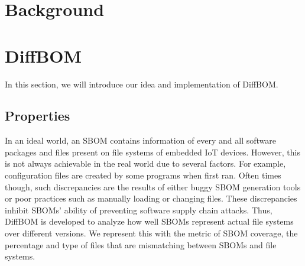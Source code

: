 \section{Background}


\section{DiffBOM}
In this section, we will introduce our idea and implementation of DiffBOM.
\subsection{Properties}
In an ideal world, an SBOM contains information of every and all software packages and files present on file systems of embedded IoT devices. However, this is not always achievable in the real world due to several factors. For example, configuration files are created by some programs when first ran. Often times though, such discrepancies are the results of either buggy SBOM generation tools or poor practices such as manually loading or changing files. These discrepancies inhibit SBOMs' ability of preventing software supply chain attacks. Thus, DiffBOM is developed to analyze how well SBOMs represent actual file systems over different versions. We represent this with the metric of SBOM coverage, the percentage and type of files that are mismatching between SBOMs and file systems.
